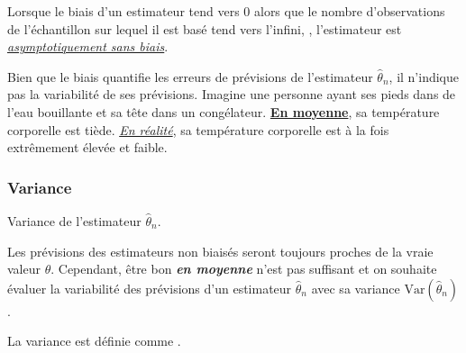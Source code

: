 \documentclass[french]{article}
\begin{document}
\begin{multicols*}{2}
\begin{definitionNOHFILL}
\begin{definitionNOHFILLprop}
Lorsque le biais d'un estimateur tend vers 0 alors que le nombre d'observations de l'échantillon sur lequel il est basé tend vers l'infini, , l'estimateur est \underline{\textit{asymptotiquement sans biais}}.
\end{definitionNOHFILLprop}
\end{definitionNOHFILL}

\begin{rappel_enhanced}[Limitations]
Bien que le biais quantifie les erreurs de prévisions de l'estimateur $\hat{\theta}_{n}$, il n'indique pas la variabilité de ses prévisions. Imagine une personne ayant ses pieds dans de l'eau bouillante et sa tête dans un congélateur. \textbf{\underline{En moyenne}}, sa température corporelle est tiède. \textit{\underline{En réalité}}, sa température corporelle est à la fois extrêmement élevée et faible. 
\end{rappel_enhanced}



\columnbreak
\subsubsection{Variance}
\begin{distributions}[Notation]
\begin{description}[font = \normalfont]
	\item[$\text{Var}(\hat{\theta}_{n})$]	Variance de l'estimateur $\hat{\theta}_{n}$.
\end{description}
\end{distributions}

\begin{rappel_enhanced}[Motivation]
Les prévisions des estimateurs non biaisés seront toujours proches de la vraie valeur $\theta$. Cependant, être bon \textit{\textbf{en moyenne}} n'est pas suffisant et on souhaite évaluer la variabilité des prévisions d'un estimateur $\hat{\theta}_{n}$ avec sa variance $\text{Var}(\hat{\theta}_{n})$. 
\end{rappel_enhanced}

\begin{definitionNOHFILL}
La variance est définie comme .
\end{definitionNOHFILL}


\end{multicols*}
\end{document}
